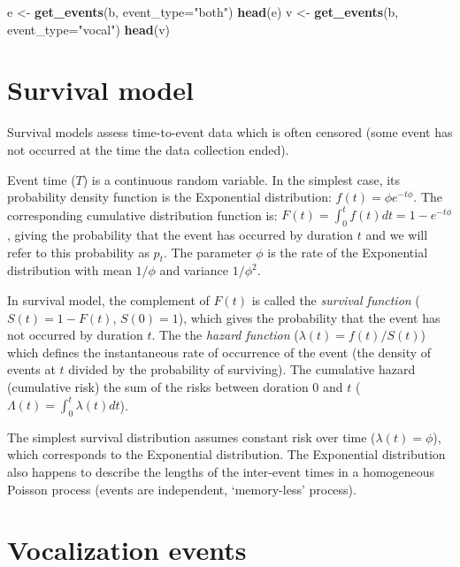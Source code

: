 \documentclass[12pt,]{book}
\newenvironment{Shaded}{\begin{snugshade}}{\end{snugshade}}
\newcommand{\DataTypeTok}[1]{\textcolor[rgb]{0.13,0.29,0.53}{#1}}
\newcommand{\KeywordTok}[1]{\textcolor[rgb]{0.13,0.29,0.53}{\textbf{#1}}}
\newcommand{\NormalTok}[1]{#1}
\newcommand{\StringTok}[1]{\textcolor[rgb]{0.31,0.60,0.02}{#1}}
\begin{document}
\begin{Shaded}
\begin{Highlighting}[]
\NormalTok{e <-}\StringTok{ }\KeywordTok{get_events}\NormalTok{(b, }\DataTypeTok{event_type=}\StringTok{"both"}\NormalTok{)}
\KeywordTok{head}\NormalTok{(e)}
\NormalTok{v <-}\StringTok{ }\KeywordTok{get_events}\NormalTok{(b, }\DataTypeTok{event_type=}\StringTok{"vocal"}\NormalTok{)}
\KeywordTok{head}\NormalTok{(v)}
\end{Highlighting}
\end{Shaded}

\hypertarget{survival-model}{%
\section{Survival model}\label{survival-model}}

Survival models assess time-to-event data which is often censored
(some event has not occurred at the time the data collection ended).

Event time (\(T\)) is a continuous random variable.
In the simplest case, its probability density function is the Exponential
distribution: \(f(t)=\phi e^{-t\phi}\).
The corresponding cumulative distribution function is:
\(F(t)=\int_{0}^{t} f(t)dt=1-e^{-t\phi}\),
giving the probability that the event has occurred by duration \(t\) and we will refer to
this probability as \(p_t\). The parameter \(\phi\) is the rate of the Exponential distribution
with mean \(1/\phi\) and variance \(1/\phi^2\).

In survival model, the complement of \(F(t)\) is called the
\emph{survival function} (\(S(t)=1-F(t)\), \(S(0)=1\)),
which gives the probability that the event has not occurred by duration \(t\).
The the \emph{hazard function} (\(\lambda(t)=f(t)/S(t)\))
which defines the instantaneous rate of occurrence of the event
(the density of events at \(t\) divided by the probability of surviving).
The cumulative hazard (cumulative risk) the sum of the risks between doration 0 and \(t\)
(\(\Lambda(t)=\int_{0}^{t} \lambda(t)dt\)).

The simplest survival distribution assumes constant risk over time (\(\lambda(t)=\phi\)),
which corresponds to the Exponential distribution.
The Exponential distribution also happens to describe the lengths of the
inter-event times in a homogeneous Poisson process (events are independent, `memory-less' process).

\hypertarget{vocalization-events}{%
\section{Vocalization events}\label{vocalization-events}}
\end{document}
